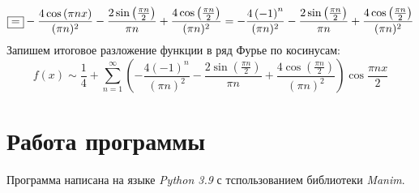 \documentclass[a5paper, 10pt]{article}
\theoremstyle{definition}
\theoremstyle{plain}
\theoremstyle{remark}
\begin{document}
\begin{equation*} 
\fbox{=} - \frac{4 \cos \left( \pi n x \right)}{(\pi n)^2} - \frac{2 \sin \left( \frac{\pi n}{2}\right)}{\pi n} + \frac{4 \cos \left( \frac{\pi n }{2} \right)}{(\pi n)^2} = - \frac{4 \left( -1 \right)^n}{(\pi n)^2} - \frac{2 \sin \left( \frac{\pi n}{2}\right)}{\pi n} + \frac{4 \cos \left( \frac{\pi n }{2} \right)}{(\pi n)^2} 
\end{equation*}
Запишем итоговое разложение функции в ряд Фурье по косинусам:
\begin{equation*} 
f(x) \sim  \frac{1}{4} + \sum \limits_{n=1}^{\infty} \left(- \frac{4 \left( -1 \right)^n}{(\pi n)^2} - \frac{2 \sin \left( \frac{\pi n}{2}\right)}{\pi n} + \frac{4 \cos \left( \frac{\pi n }{2} \right)}{(\pi n)^2} \right) \cos \frac{\pi n x}{2}
\end{equation*}


\newpage

\section{Работа программы}
Программа написана на языке \textit{Python 3.9} с тспользованием библиотеки \textit{Manim}.
\end{document}
